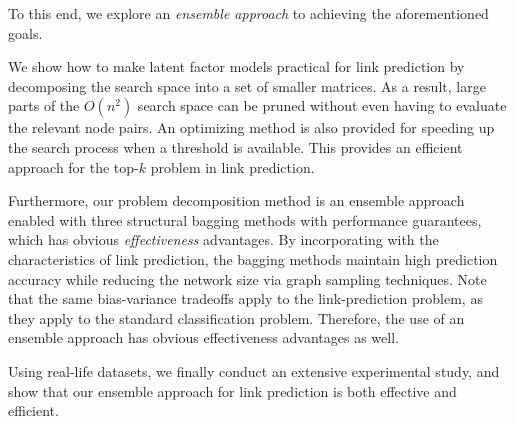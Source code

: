 To this end, we explore an {\em ensemble approach} to
achieving the aforementioned goals.

We show how to make latent factor models
practical for link prediction by decomposing the search space into a
 set of smaller matrices. As a result, large parts of the $O(n^2)$
search space can be pruned without even having to evaluate the
relevant node pairs. An optimizing method is also provided for
speeding up the search process when a threshold is available.
This provides an efficient approach for the
top-$k$ problem in link prediction.

Furthermore, our problem
decomposition method is an ensemble approach enabled with three
structural bagging methods with performance guarantees, which has obvious {\em
effectiveness} advantages. By incorporating with the characteristics of  link prediction, the bagging methods maintain high prediction
accuracy while reducing the network size via graph sampling techniques.
Note that the same bias-variance
tradeoffs apply to the link-prediction problem, as they apply to the
standard classification problem. Therefore, the use of an ensemble
approach has obvious effectiveness advantages as well.


Using real-life datasets, we finally conduct an extensive experimental study, and show that our ensemble approach for link prediction is both effective and efficient.









